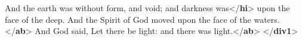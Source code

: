 \begin{shaded}
\hspace*{1em}And the earth was without form, and void; and darkness\mbox{}\newline 
\hspace*{1em}was{</\textbf{hi}>} upon the face of the deep. And the Spirit of God\mbox{}\newline 
\hspace*{1em}\hspace*{1em}\hspace*{1em}\hspace*{1em} moved upon the face of the waters.{</\textbf{ab}>}\mbox{}\newline 
\hspace*{1em}And God said, Let there be light: and there was\mbox{}\newline 
\hspace*{1em}\hspace*{1em}\hspace*{1em}\hspace*{1em} light.{</\textbf{ab}>}\mbox{}\newline 
{}\mbox{}\newline 
{</\textbf{div1}>}\end{shaded}\egroup\par \noindent  \par

